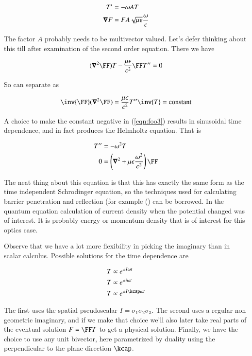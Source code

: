 \begin{align}\label{eqn:foo5}
T' &= -\omega A T \\
\boldsymbol{\nabla} F &= F A \sqrt{\mu\epsilon} \frac{\omega}{c}
\end{align}

The factor $A$ probably needs to be multivector valued.  Let's defer thinking about this till after examination of the second order equation.  There we have

\begin{align*}
(\spacegrad^2 \FF) T - \frac{\mu\epsilon}{c^2} \FF T'' = 0
\end{align*}

So can separate as 

\begin{align}\label{eqn:foo3}
\inv{\FF} (\spacegrad^2 \FF) = \frac{\mu\epsilon}{c^2} T'' \inv{T} = \text{constant}
\end{align}

A choice to make the constant negative in (\ref{eqn:foo3}) results in sinusoidal time dependence, and in fact produces the Helmholtz equation.  That is

\begin{align}\label{eqn:foo4}
T'' &= - \omega^2 T \\
  0 &= \left(\spacegrad^2 + \mu\epsilon \frac{\omega^2}{c^2} \right) \FF 
\end{align}

The neat thing about this equation is that this has exactly the same form as the time independent Schrodinger equation, so the techniques used for calculating barrier penetration and reflection (for example (\citep{bohm1989qt}) can be borrowed.  In the quantum equation calculation of current density when the potential changed was of interest.  It is probably energy or momentum density that is of interest for this optics case.

Observe that we have a lot more flexibility in picking the imaginary than in scalar calculus.  Possible solutions for the time dependence are

\begin{align*}
T &\propto e^{\pm I\omega t} \\
T &\propto e^{\pm i\omega t} \\
T &\propto e^{\pm I \kcap \omega t}
\end{align*}

The first uses the spatial pseudoscalar $I = \sigma_1 \sigma_2 \sigma_3$.  The second uses a regular non-geometric imaginary, and if we make that choice we'll also later take real parts of the eventual solution $F = \FF T$ to get a physical solution.  Finally, we have the choice to use any unit bivector, here parametrized by duality using the perpendicular to the plane direction $\kcap$.

\EndArticle
